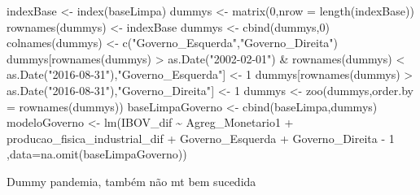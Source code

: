 \documentclass[
]{article}
\newenvironment{Shaded}{\begin{snugshade}}{\end{snugshade}}
\newcommand{\AttributeTok}[1]{\textcolor[rgb]{0.77,0.63,0.00}{#1}}
\newcommand{\DecValTok}[1]{\textcolor[rgb]{0.00,0.00,0.81}{#1}}
\newcommand{\FunctionTok}[1]{\textcolor[rgb]{0.00,0.00,0.00}{#1}}
\newcommand{\NormalTok}[1]{#1}
\newcommand{\OtherTok}[1]{\textcolor[rgb]{0.56,0.35,0.01}{#1}}
\newcommand{\SpecialCharTok}[1]{\textcolor[rgb]{0.00,0.00,0.00}{#1}}
\newcommand{\StringTok}[1]{\textcolor[rgb]{0.31,0.60,0.02}{#1}}
\begin{document}
\begin{Shaded}
\begin{Highlighting}[]
\NormalTok{indexBase }\OtherTok{\textless{}{-}} \FunctionTok{index}\NormalTok{(baseLimpa)}
\NormalTok{dummys }\OtherTok{\textless{}{-}} \FunctionTok{matrix}\NormalTok{(}\DecValTok{0}\NormalTok{,}\AttributeTok{nrow =} \FunctionTok{length}\NormalTok{(indexBase))}
\FunctionTok{rownames}\NormalTok{(dummys) }\OtherTok{\textless{}{-}}\NormalTok{ indexBase}
\NormalTok{dummys }\OtherTok{\textless{}{-}} \FunctionTok{cbind}\NormalTok{(dummys,}\DecValTok{0}\NormalTok{)}
\FunctionTok{colnames}\NormalTok{(dummys) }\OtherTok{\textless{}{-}} \FunctionTok{c}\NormalTok{(}\StringTok{"Governo\_Esquerda"}\NormalTok{,}\StringTok{"Governo\_Direita"}\NormalTok{)}
\NormalTok{dummys[}\FunctionTok{rownames}\NormalTok{(dummys) }\SpecialCharTok{\textgreater{}} \FunctionTok{as.Date}\NormalTok{(}\StringTok{"2002{-}02{-}01"}\NormalTok{) }\SpecialCharTok{\&} \FunctionTok{rownames}\NormalTok{(dummys) }\SpecialCharTok{\textless{}} \FunctionTok{as.Date}\NormalTok{(}\StringTok{"2016{-}08{-}31"}\NormalTok{),}\StringTok{"Governo\_Esquerda"}\NormalTok{] }\OtherTok{\textless{}{-}} \DecValTok{1}
\NormalTok{dummys[}\FunctionTok{rownames}\NormalTok{(dummys) }\SpecialCharTok{\textgreater{}} \FunctionTok{as.Date}\NormalTok{(}\StringTok{"2016{-}08{-}31"}\NormalTok{),}\StringTok{"Governo\_Direita"}\NormalTok{] }\OtherTok{\textless{}{-}} \DecValTok{1}
\NormalTok{dummys }\OtherTok{\textless{}{-}} \FunctionTok{zoo}\NormalTok{(dummys,}\AttributeTok{order.by =} \FunctionTok{rownames}\NormalTok{(dummys))}
\NormalTok{baseLimpaGoverno }\OtherTok{\textless{}{-}} \FunctionTok{cbind}\NormalTok{(baseLimpa,dummys)}
\NormalTok{modeloGoverno }\OtherTok{\textless{}{-}} \FunctionTok{lm}\NormalTok{(IBOV\_dif }\SpecialCharTok{\textasciitilde{}}\NormalTok{ Agreg\_Monetario1 }\SpecialCharTok{+}\NormalTok{ producao\_fisica\_industrial\_dif }\SpecialCharTok{+}\NormalTok{ Governo\_Esquerda }\SpecialCharTok{+}\NormalTok{ Governo\_Direita }\SpecialCharTok{{-}} \DecValTok{1}
\NormalTok{  ,}\AttributeTok{data=}\FunctionTok{na.omit}\NormalTok{(baseLimpaGoverno))}
\end{Highlighting}
\end{Shaded}

Dummy pandemia, também não mt bem sucedida
\end{document}
